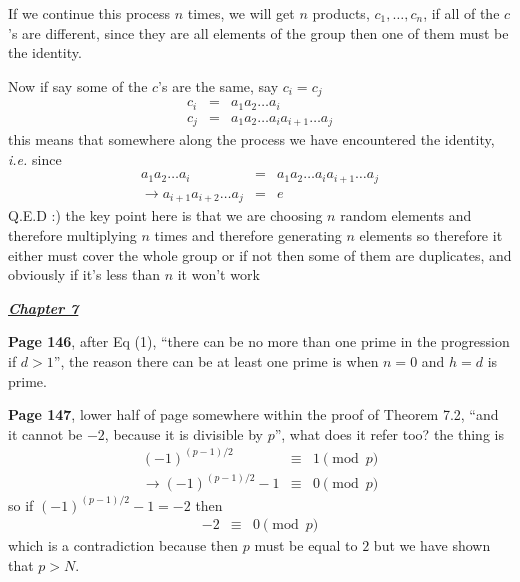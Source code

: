 \documentclass[aps,preprint,preprintnumbers,nofootinbib,showpacs,prd]{revtex4-1}
\newcommand{\ie}{{\it i.e.} }
\newcommand{\nbea}{\begin{eqnarray*}}
\newcommand{\neea}{\end{eqnarray*}}
\begin{document}
If we continue this process $n$ times, we will get $n$ products, $c_1, \ldots,c_n$, if all of the $c$'s are different, since they are all elements of the group then one of them must be the identity.

Now if say some of the $c$'s are the same, say $c_i = c_j$
%
\nbea
c_i & = & a_1 a_2 \ldots a_i \\
c_j & = & a_1 a_2 \ldots a_i a_{i+1}\ldots a_j
\neea
%
this means that somewhere along the process we have encountered the identity, \ie since
%
\nbea
a_1 a_2 \ldots a_i & = & a_1 a_2 \ldots a_i a_{i+1}\ldots a_j \\
\to a_{i+1}a_{i+2}\ldots a_j & = & e
\neea
%
Q.E.D :) the key point here is that we are choosing $n$ random elements and therefore multiplying $n$ times and therefore generating $n$ elements so therefore it either must cover the whole group or if not then some of them are duplicates, and obviously if it's less than $n$ it won't work

\bigskip
\underline{\textbf{\textit{Chapter 7}}}
\bigskip

{\bf Page 146}, after Eq (1), ``there can be no more than one prime in the progression if $d>1$'', the reason there can be at least one prime is when $n=0$ and $h=d$ is prime.

{\bf Page 147}, lower half of page somewhere within the proof of Theorem 7.2, ``and it cannot be $-2$, because it is divisible by $p$'', what does it refer too? the thing is
%
\nbea
(-1)^{(p-1)/2} &\equiv& 1 \pmod{p} \\
\to (-1)^{(p-1)/2} - 1 &\equiv& 0 \pmod{p}
\neea
%
so if $(-1)^{(p-1)/2} - 1 = -2$ then
%
\nbea
-2&\equiv& 0 \pmod{p}
\neea
%
which is a contradiction because then $p$ must be equal to $2$ but we have shown that $p > N$.
\end{document}
